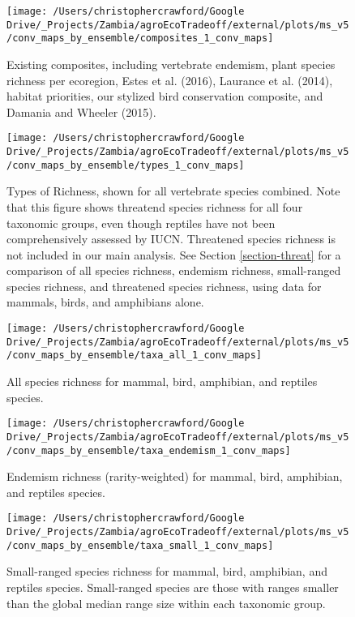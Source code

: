 \documentclass[
]{article}
\begin{document}
\begin{figure}
\texttt{[image: /Users/christophercrawford/Google Drive/\_Projects/Zambia/agroEcoTradeoff/external/plots/ms\_v5/conv\_maps\_by\_ensemble/composites\_1\_conv\_maps]} \caption{Existing composites, including vertebrate endemism, plant species richness per ecoregion, Estes et al. (2016), Laurance et al. (2014), habitat priorities, our stylized bird conservation composite, and Damania and Wheeler (2015).}\label{fig:conv-maps-comp-1}
\end{figure}

\begin{figure}
\texttt{[image: /Users/christophercrawford/Google Drive/\_Projects/Zambia/agroEcoTradeoff/external/plots/ms\_v5/conv\_maps\_by\_ensemble/types\_1\_conv\_maps]} \caption{Types of Richness, shown for all vertebrate species combined. Note that this figure shows threatend species richness for all four taxonomic groups, even though reptiles have not been comprehensively assessed by IUCN. Threatened species richness is not included in our main analysis. See Section \ref{section-threat} for a comparison of all species richness, endemism richness, small-ranged species richness, and threatened species richness, using data for mammals, birds, and amphibians alone.}\label{fig:conv-maps-types-1}
\end{figure}

\begin{figure}
\texttt{[image: /Users/christophercrawford/Google Drive/\_Projects/Zambia/agroEcoTradeoff/external/plots/ms\_v5/conv\_maps\_by\_ensemble/taxa\_all\_1\_conv\_maps]} \caption{All species richness for mammal, bird, amphibian, and reptiles species.}\label{fig:conv-maps-taxa-all-1}
\end{figure}

\begin{figure}
\texttt{[image: /Users/christophercrawford/Google Drive/\_Projects/Zambia/agroEcoTradeoff/external/plots/ms\_v5/conv\_maps\_by\_ensemble/taxa\_endemism\_1\_conv\_maps]} \caption{Endemism richness (rarity-weighted) for mammal, bird, amphibian, and reptiles species.}\label{fig:conv-maps-taxa-endemism-1}
\end{figure}

\begin{figure}
\texttt{[image: /Users/christophercrawford/Google Drive/\_Projects/Zambia/agroEcoTradeoff/external/plots/ms\_v5/conv\_maps\_by\_ensemble/taxa\_small\_1\_conv\_maps]} \caption{Small-ranged species richness for mammal, bird, amphibian, and reptiles species. Small-ranged species are those with ranges smaller than the global median range size within each taxonomic group.}\label{fig:conv-maps-taxa-small-1}
\end{figure}
\end{document}
